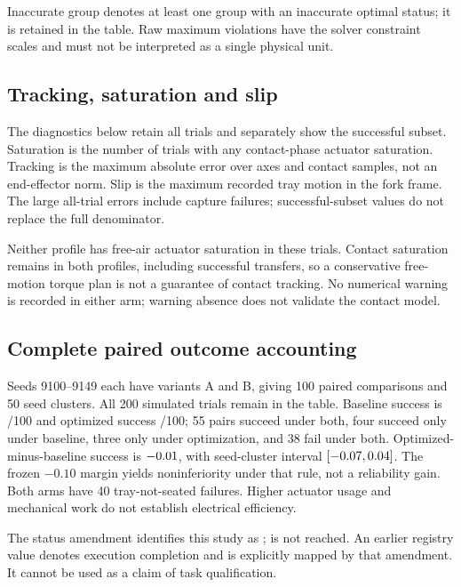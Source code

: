 \begin{center}\small\end{center}
Inaccurate group denotes at least one group with an inaccurate optimal status; it is retained in the table. Raw maximum violations have the solver constraint scales and must not be interpreted as a single physical unit.

\subsection{Tracking, saturation and slip}
The diagnostics below retain all trials and separately show the successful subset. Saturation is the number of trials with any contact-phase actuator saturation. Tracking is the maximum absolute error over axes and contact samples, not an end-effector norm. Slip is the maximum recorded tray motion in the fork frame. The large all-trial errors include capture failures; successful-subset values do not replace the full denominator.
\begin{center}\small\end{center}
Neither profile has free-air actuator saturation in these trials. Contact saturation remains in both profiles, including successful transfers, so a conservative free-motion torque plan is not a guarantee of contact tracking. No numerical warning is recorded in either arm; warning absence does not validate the contact model.

\subsection{Complete paired outcome accounting}
Seeds 9100--9149 each have variants A and B, giving 100 paired comparisons and 50 seed clusters. All 200 simulated trials remain in the table. Baseline success is \GantryBaselinePass{}/100 and optimized success \GantryOptimisedPass{}/100; 55 pairs succeed under both, four succeed only under baseline, three only under optimization, and 38 fail under both. Optimized-minus-baseline success is $-0.01{}$, with seed-cluster interval $[-0.07{},0.04{}]$. The frozen $-0.10$ margin yields noninferiority under that rule, not a reliability gain. Both arms have 40 tray-not-seated failures. Higher actuator usage and mechanical work do not establish electrical efficiency.

The status amendment identifies this study as ;  is not reached. An earlier registry value  denotes execution completion and is explicitly mapped by that amendment. It cannot be used as a claim of task qualification.
\begin{center}\scriptsize\end{center}

